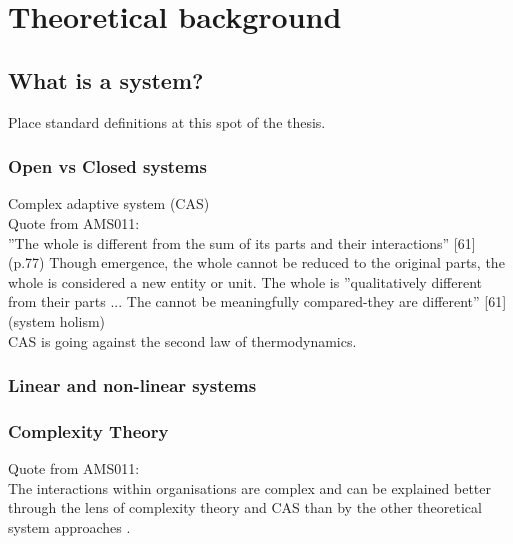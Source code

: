 \chapter{Theoretical background}
\label{ch:theoreticalbackground}

\section{What is a system?}
\label{sec:tbsystem}

\begin{remark}
	Place standard definitions at this spot of the thesis.
\end{remark}

\subsection{Open vs Closed systems}
\label{sub:tbopenclosedsystems}
Complex adaptive system (CAS)\\

Quote from AMS011: \parencite{Turner2019}\\
''The whole is different from the sum of its parts and their interactions'' [61] (p.77) Though emergence, the whole cannot be reduced to the original parts, the whole is considered a new entity or unit. The whole is ''qualitatively different from their parts ... The cannot be meaningfully compared-they are different'' [61] (system holism)\\
CAS is going against the second law of thermodynamics.\\

\subsection{Linear and non-linear systems}
\label{sub:linearnonlinear}

\subsection{Complexity Theory}
\label{sub:tbcomplexitytheory}
Quote from AMS011:\\
The interactions within organisations are complex and can be explained better through the lens of complexity theory and CAS than by the other theoretical system approaches \parencite[p. 15]{Turner2019}.\\

